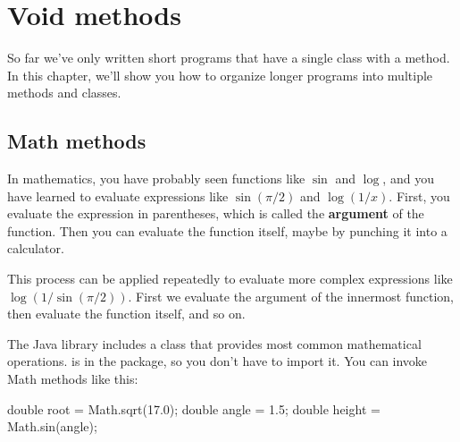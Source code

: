 \chapter{Void methods}

So far we've only written short programs that have a single class with a  method.
In this chapter, we'll show you how to organize longer programs into multiple methods and classes.





\section{Math methods}


In mathematics, you have probably seen functions like $\sin$ and $\log$, and you have learned to evaluate expressions like $\sin(\pi/2)$ and $\log(1/x)$.
First, you evaluate the expression in parentheses, which is called the {\bf argument} of the function.
Then you can evaluate the function itself, maybe by punching it into a calculator.

This process can be applied repeatedly to evaluate more complex expressions like $\log(1/\sin(\pi/2))$.
First we evaluate the argument of the innermost function, then evaluate the function itself, and so on.

The Java library includes a  class that provides most common mathematical operations.
 is in the  package, so you don't have to import it.  You can invoke Math methods like this:

\begin{code}
    double root = Math.sqrt(17.0);
    double angle = 1.5;
    double height = Math.sin(angle);
\end{code}

